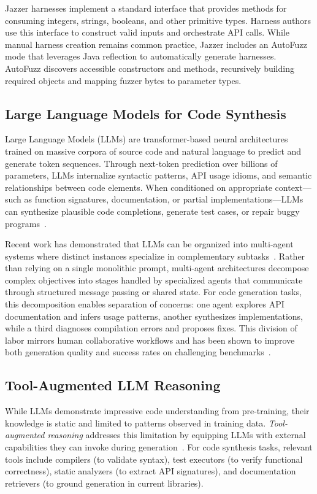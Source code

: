 Jazzer harnesses implement a standard interface that provides methods for consuming integers, strings, booleans, and other primitive types. Harness authors use this interface to construct valid inputs and orchestrate API calls. While manual harness creation remains common practice, Jazzer includes an AutoFuzz mode that leverages Java reflection to automatically generate harnesses. AutoFuzz discovers accessible constructors and methods, recursively building required objects and mapping fuzzer bytes to parameter types. 


\subsection{Large Language Models for Code Synthesis}
\label{sec:prelim:llm}

Large Language Models (LLMs) are transformer-based neural architectures trained on massive corpora of source code and natural language to predict and generate token sequences. Through next-token prediction over billions of parameters, LLMs internalize syntactic patterns, API usage idioms, and semantic relationships between code elements. When conditioned on appropriate context—such as function signatures, documentation, or partial implementations—LLMs can synthesize plausible code completions, generate test cases, or repair buggy programs~\cite{CITE:Codex,CITE:AlphaCode}.

Recent work has demonstrated that LLMs can be organized into multi-agent systems where distinct instances specialize in complementary subtasks~\cite{CITE:MultiAgentCode}. Rather than relying on a single monolithic prompt, multi-agent architectures decompose complex objectives into stages handled by specialized agents that communicate through structured message passing or shared state. For code generation tasks, this decomposition enables separation of concerns: one agent explores API documentation and infers usage patterns, another synthesizes implementations, while a third diagnoses compilation errors and proposes fixes. This division of labor mirrors human collaborative workflows and has been shown to improve both generation quality and success rates on challenging benchmarks~\cite{CITE:AgentBench}.

\subsection{Tool-Augmented LLM Reasoning}
\label{sec:prelim:tools}

While LLMs demonstrate impressive code understanding from pre-training, their knowledge is static and limited to patterns observed in training data. \emph{Tool-augmented reasoning} addresses this limitation by equipping LLMs with external capabilities they can invoke during generation~\cite{DBLP:conf/nips/SchickDSHWSCSW23:Toolformer,CITE:ToolLLM}. For code synthesis tasks, relevant tools include compilers (to validate syntax), test executors (to verify functional correctness), static analyzers (to extract API signatures), and documentation retrievers (to ground generation in current libraries).

